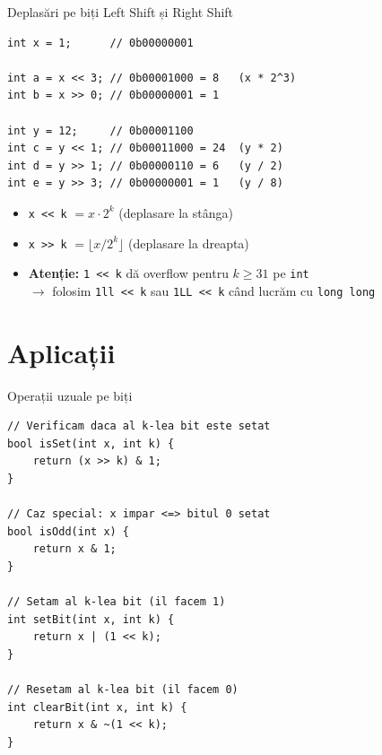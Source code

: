 ﻿\documentclass{beamer}
\begin{document}
\begin{frame}{Deplasări pe biți \textemdash{} Left Shift și Right Shift}
  \begin{center}
  \begin{lstlisting}
int x = 1;      // 0b00000001

int a = x << 3; // 0b00001000 = 8   (x * 2^3)
int b = x >> 0; // 0b00000001 = 1

int y = 12;     // 0b00001100
int c = y << 1; // 0b00011000 = 24  (y * 2)
int d = y >> 1; // 0b00000110 = 6   (y / 2)
int e = y >> 3; // 0b00000001 = 1   (y / 8)
  \end{lstlisting}
  \end{center}
  \begin{itemize}
    \item \lstinline|x << k| $= x \cdot 2^k$ \quad (deplasare la stânga)
    \item \lstinline|x >> k| $= \lfloor x / 2^k \rfloor$ \quad (deplasare la dreapta)
    \item \textbf{Atenție:} \lstinline|1 << k| dă overflow pentru $k \geq 31$ pe \lstinline|int| \\
      $\rightarrow$ folosim \lstinline|1ll << k| sau \lstinline|1LL << k| când lucrăm cu \lstinline|long long|
  \end{itemize}
\end{frame}

\section{Aplicații}

\begin{frame}[fragile]{Operații uzuale pe biți}
  \begin{lstlisting}
// Verificam daca al k-lea bit este setat
bool isSet(int x, int k) {
    return (x >> k) & 1;
}

// Caz special: x impar <=> bitul 0 setat
bool isOdd(int x) {
    return x & 1;
}

// Setam al k-lea bit (il facem 1)
int setBit(int x, int k) {
    return x | (1 << k);
}

// Resetam al k-lea bit (il facem 0)
int clearBit(int x, int k) {
    return x & ~(1 << k);
}
  \end{lstlisting}
\end{frame}
\end{document}
